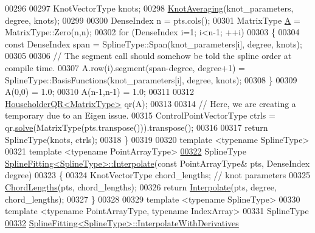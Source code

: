 \begin{DoxyCode}
00296 
00297     KnotVectorType knots;
00298     \hyperlink{group___splines___module_ga9474da5ed68bbd9a6788a999330416d6}{KnotAveraging}(knot\_parameters, degree, knots);
00299 
00300     DenseIndex n = pts.cols();
00301     MatrixType \hyperlink{group___core___module_class_eigen_1_1_matrix}{A} = MatrixType::Zero(n,n);
00302     \textcolor{keywordflow}{for} (DenseIndex i=1; i<n-1; ++i)
00303     \{
00304       \textcolor{keyword}{const} DenseIndex span = SplineType::Span(knot\_parameters[i], degree, knots);
00305 
00306       \textcolor{comment}{// The segment call should somehow be told the spline order at compile time.}
00307       A.row(i).segment(span-degree, degree+1) = SplineType::BasisFunctions(knot\_parameters[i], degree, 
      knots);
00308     \}
00309     A(0,0) = 1.0;
00310     A(n-1,n-1) = 1.0;
00311 
00312     \hyperlink{group___q_r___module}{HouseholderQR<MatrixType>} qr(A);
00313 
00314     \textcolor{comment}{// Here, we are creating a temporary due to an Eigen issue.}
00315     ControlPointVectorType ctrls = qr.\hyperlink{group___q_r___module_a3e8e56769bbaaed0616ad98c4ff99c7b}{solve}(MatrixType(pts.transpose())).transpose();
00316 
00317     \textcolor{keywordflow}{return} SplineType(knots, ctrls);
00318   \}
00319 
00320   \textcolor{keyword}{template} <\textcolor{keyword}{typename} SplineType>
00321   \textcolor{keyword}{template} <\textcolor{keyword}{typename} Po\textcolor{keywordtype}{int}ArrayType>
\hyperlink{group___splines___module_adc80b6f0dd0dbbea28130fb254626874}{00322}   SplineType \hyperlink{group___splines___module_adc80b6f0dd0dbbea28130fb254626874}{SplineFitting<SplineType>::Interpolate}(\textcolor{keyword}{const} 
      PointArrayType& pts, DenseIndex degree)
00323   \{
00324     KnotVectorType chord\_lengths; \textcolor{comment}{// knot parameters}
00325     \hyperlink{group___splines___module_ga1b4cbde5d98411405871accf877552d2}{ChordLengths}(pts, chord\_lengths);
00326     \textcolor{keywordflow}{return} \hyperlink{group___splines___module_adc80b6f0dd0dbbea28130fb254626874}{Interpolate}(pts, degree, chord\_lengths);
00327   \}
00328   
00329   \textcolor{keyword}{template} <\textcolor{keyword}{typename} SplineType>
00330   \textcolor{keyword}{template} <\textcolor{keyword}{typename} Po\textcolor{keywordtype}{int}ArrayType, \textcolor{keyword}{typename} IndexArray>
00331   SplineType 
\hyperlink{group___splines___module_a0317c97f2b57ccf5dcf077409d51e54d}{00332}   \hyperlink{group___splines___module_a7bd937fdcfa168dbdc27932886a4da9f}{SplineFitting<SplineType>::InterpolateWithDerivatives}

\end{DoxyCode}
